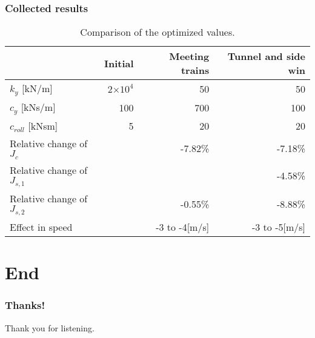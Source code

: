 \documentclass{beamer}
\begin{document}
\begin{frame}
\frametitle{Collected results}
\begin{table}
 \caption{Comparison of the optimized values.}
 \vskip 1mm
 \label{tab:passive_opt_results}
 \begin{tabular}{|l|r|r|r|}
  \hline                    & Initial         & Meeting trains & Tunnel and side win\\
  \hline $k_y$ [kN/m]       & 2$\times10^{4}$ &             50 &                  50\\
  \hline $c_y$ [kNs/m]      &             100 &            700 &                 100\\
  \hline $c_{roll}$  [kNsm] &               5 &             20 &                  20\\
  \hline Relative change of $J_c$      &      &        -7.82\% &             -7.18\%\\
  \hline Relative change of $J_{s,1}$  &      &                &             -4.58\%\\
  \hline Relative change of $J_{s,2}$  &      &        -0.55\% &             -8.88\%\\
  \hline Effect in speed               &      &  -3 to -4[m/s] &       -3 to -5[m/s]\\
  \hline
 \end{tabular}
\end{table}
\end{frame}
\section{End}
\begin{frame}
 \frametitle{Thanks!}
 \begin{center}
 \Large{Thank you for listening.}
 \end{center}
\end{frame}
\end{document}
